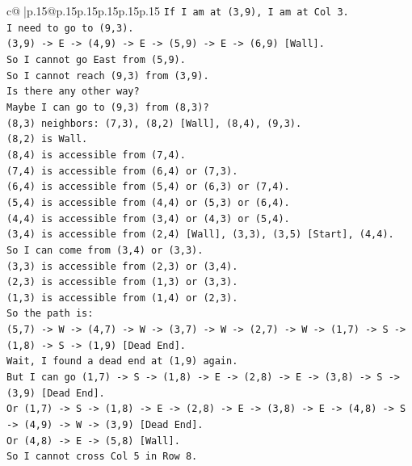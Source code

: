 \documentclass{article}
\begin{document}
{\begin{supertabular}{c@{$\;$}|p{.15\linewidth}@{}p{.15\linewidth}p{.15\linewidth}p{.15\linewidth}p{.15\linewidth}p{.15\linewidth}}
{{{\texttt{If I am at (3,9), I am at Col 3.} \\
\texttt{I need to go to (9,3).} \\
\texttt{(3,9) {-}> E {-}> (4,9) {-}> E {-}> (5,9) {-}> E {-}> (6,9) {[}Wall{]}.} \\
\texttt{So I cannot go East from (5,9).} \\
\texttt{So I cannot reach (9,3) from (3,9).} \\
\texttt{Is there any other way?} \\
\texttt{Maybe I can go to (9,3) from (8,3)?} \\
\texttt{(8,3) neighbors: (7,3), (8,2) {[}Wall{]}, (8,4), (9,3).} \\
\texttt{(8,2) is Wall.} \\
\texttt{(8,4) is accessible from (7,4).} \\
\texttt{(7,4) is accessible from (6,4) or (7,3).} \\
\texttt{(6,4) is accessible from (5,4) or (6,3) or (7,4).} \\
\texttt{(5,4) is accessible from (4,4) or (5,3) or (6,4).} \\
\texttt{(4,4) is accessible from (3,4) or (4,3) or (5,4).} \\
\texttt{(3,4) is accessible from (2,4) {[}Wall{]}, (3,3), (3,5) {[}Start{]}, (4,4).} \\
\texttt{So I can come from (3,4) or (3,3).} \\
\texttt{(3,3) is accessible from (2,3) or (3,4).} \\
\texttt{(2,3) is accessible from (1,3) or (3,3).} \\
\texttt{(1,3) is accessible from (1,4) or (2,3).} \\
\texttt{So the path is:} \\
\texttt{(5,7) {-}> W {-}> (4,7) {-}> W {-}> (3,7) {-}> W {-}> (2,7) {-}> W {-}> (1,7) {-}> S {-}> (1,8) {-}> S {-}> (1,9) {[}Dead End{]}.} \\
\texttt{Wait, I found a dead end at (1,9) again.} \\
\texttt{But I can go (1,7) {-}> S {-}> (1,8) {-}> E {-}> (2,8) {-}> E {-}> (3,8) {-}> S {-}> (3,9) {[}Dead End{]}.} \\
\texttt{Or (1,7) {-}> S {-}> (1,8) {-}> E {-}> (2,8) {-}> E {-}> (3,8) {-}> E {-}> (4,8) {-}> S {-}> (4,9) {-}> W {-}> (3,9) {[}Dead End{]}.} \\
\texttt{Or (4,8) {-}> E {-}> (5,8) {[}Wall{]}.} \\
\texttt{So I cannot cross Col 5 in Row 8.} \\
}}}
\end{supertabular}}
\end{document}
